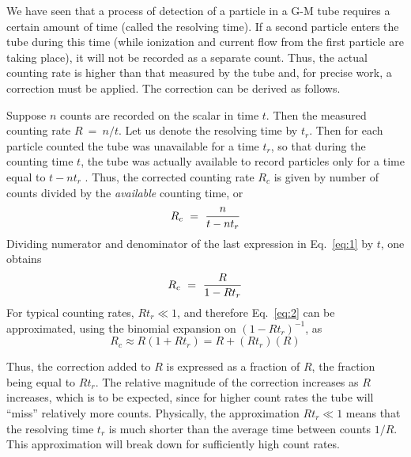 We have seen that a process of detection of a particle in a G-M tube
requires a certain amount of time (called the resolving time). If a
second particle enters the tube during this time (while ionization and
current flow from the first particle are taking place), it will not be
recorded as a separate count.  Thus, the actual counting rate is
higher than that measured by the tube and, for precise work, a
correction must be applied.  The correction can be derived as follows.

Suppose $n$ counts are recorded on the scalar in time $t$.  Then the
measured counting rate $R~=~n/t$.  Let us denote the resolving time by
$t_r$.  Then for each particle counted the tube
was unavailable for a time $t_r$, so that during the
counting time $t$, the tube was actually available to record particles
only for a time equal to $t - n t_r$ . Thus, the corrected
counting rate $R_{c}$ is given by number of counts divided by the {\em available} counting time, or
\begin{equation}
R_c ~=~ { n \over t - n t_r }
\label{eq:1}
\end{equation}
Dividing numerator and denominator of the last expression in Eq.~\ref{eq:1} by
$t$, one obtains
\begin{equation}
R_c ~=~ { R \over 1 - R t_r }
\label{eq:2}
\end{equation}
For typical counting rates, $R t_{r} \ll 1$, and therefore Eq.~\ref{eq:2} can be approximated,
using the binomial expansion on $(1-R t_r)^{-1}$, as
\begin{equation}
R_{c} \approx R(1 + Rt_{r}) = R + (Rt_{r})(R)
\label{eq:3}
\end{equation}

Thus, the correction added to $R$ is expressed as a fraction of $R$, the
fraction being equal to $Rt_{r}$.  The relative
magnitude of the correction increases as $R$ increases, which is to be
expected, since for higher count rates the tube will
``miss'' relatively more counts.
Physically, the approximation
$Rt_{r} \ll 1$ means that the resolving
time $t_{r}$ is much shorter than the average time between
counts $1/R$.  This approximation will break down for sufficiently high
count rates.

